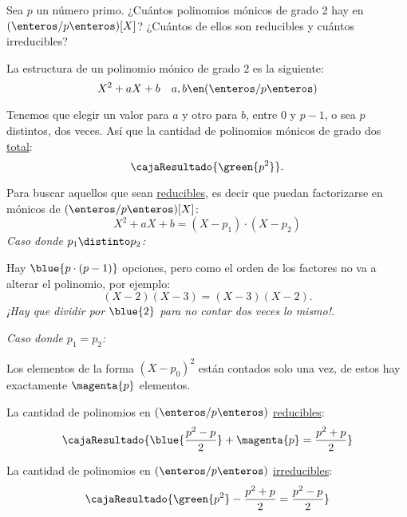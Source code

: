 \begin{enunciado}{\ejercicio}
  Sea $p$ un número primo. ¿Cuántos polinomios mónicos de grado 2 hay en $(\enteros/p\enteros)[X]$? ¿Cuántos de ellos
  son reducibles y cuántos irreducibles?
\end{enunciado}

La estructura de un polinomio mónico de grado $2$ es la siguiente:
$$
  X^2 + aX + b \quad a, b \en (\enteros/p\enteros)
$$

Tenemos que elegir un valor para $a$ y otro para $b$, entre $0$ y $p-1$, o sea
$p$ distintos, dos veces.
Así que la cantidad de polinomios mónicos de grado dos \ul{total}:
$$
  \cajaResultado{\green{p^2}}.
$$

Para buscar aquellos que sean \ul{reducibles}, es decir que puedan factorizarse en mónicos de $(\enteros/p\enteros)[X]$:
$$
  X^2 + aX + b
  =
  (X - p_1) \cdot (X - p_2)
$$
\textit{Caso donde $p_1 \distinto p_2$:}

Hay $\blue{p \cdot (p - 1)}$ opciones, pero como el orden de los factores no va a alterar el polinomio,
por ejemplo:
$$
  (X - 2)(X - 3) = (X - 3)(X - 2).
$$
\textit{¡Hay que dividir por $\blue{2}$ para no contar dos veces lo mismo!}.

\textit{Caso donde $p_1 = p_2$:}

Los elementos de la forma $(X - p_0)^2$ están contados solo una vez,
de estos hay exactamente $\magenta{p}$ elementos.

La cantidad de polinomios en $(\enteros/p\enteros)$ \ul{reducibles}:
$$
  \cajaResultado{\blue{\frac{p^2 - p}{2}} + \magenta{p} = \frac{p^2 + p}{2}}
$$

La cantidad de polinomios en $(\enteros/p\enteros)$ \ul{irreducibles}:
$$
  \cajaResultado{
    \green{p^2} - \frac{p^2 + p}{2} = \frac{p^2 - p}{2}
  }
$$

\begin{aportes}
  \item {}
  \item {}
\end{aportes}
